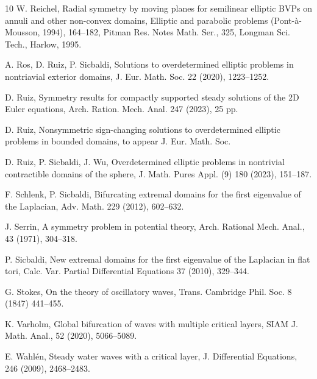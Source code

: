 \documentclass[reqno]{amsart}
\numberwithin{equation}{section}
\numberwithin{equation}{section}
\numberwithin{equation}{section}
\begin{document}
\begin{thebibliography}{10}
 W. Reichel, Radial symmetry by moving planes for semilinear elliptic BVPs on annuli and other non-convex domains, Elliptic and parabolic problems (Pont-\`{a}-Mousson, 1994), 164--182, Pitman Res. Notes Math. Ser., 325, Longman Sci. Tech., Harlow, 1995.


 A. Ros, D. Ruiz, P. Sicbaldi, Solutions to overdetermined elliptic problems in nontriavial exterior domains, J. Eur. Math. Soc. 22 (2020), 1223--1252.

 D. Ruiz, Symmetry results for compactly supported steady solutions of the 2D Euler equations, Arch. Ration. Mech. Anal. 247 (2023), 25 pp.

 D. Ruiz, Nonsymmetric sign-changing solutions to overdetermined elliptic problems in bounded domains, to appear J. Eur. Math. Soc.

 D. Ruiz, P. Sicbaldi, J. Wu, Overdetermined elliptic problems in nontrivial contractible domains of the sphere, J. Math. Pures Appl. (9) 180 (2023), 151--187.


 F. Schlenk, P. Sicbaldi, Bifurcating extremal domains for the first eigenvalue of the Laplacian, Adv. Math. 229 (2012), 602--632.


 J. Serrin, A symmetry problem in potential theory, Arch. Rational Mech. Anal., 43 (1971), 304--318.

 P. Sicbaldi, New extremal domains for the first eigenvalue of the Laplacian in flat tori, Calc. Var. Partial Differential Equations 37 (2010), 329--344.

 G. Stokes, On the theory of oscillatory waves, Trans. Cambridge Phil. Soc. 8 (1847) 441--455.


 K. Varholm, Global bifurcation of waves with multiple critical layers, SIAM J. Math. Anal., 52 (2020), 5066--5089.

 E. Wahl\'{e}n, Steady water waves with a critical layer, J. Differential Equations, 246 (2009), 2468--2483.


\end{thebibliography}
\end{document}
